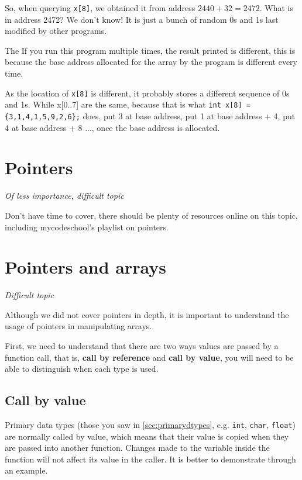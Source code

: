 So, when querying \texttt{x[8]}, we obtained it from address $2440+32 = 2472$. What is in address 2472? We don't know! It is just a bunch of random 0s and 1s last modified by other programs. 
\vspace{6mm}

\if{} The \else If you run this program multiple times, the result printed is different, this is because the \fi base address allocated for the array by the program is different every time. 

As the location of \texttt{x[8]} is different, it probably stores a different sequence of 0s and 1s. While x[0..7] are the same, because that is what \texttt{int x[8] = \{3,1,4,1,5,9,2,6\};} does, put 3 at base address, put 1 at base address + 4, put 4 at base address + 8 ..., once the base address is allocated.

\section{Pointers}

\textit{Of less importance, difficult topic}
\vspace{6mm}

Don't have time to cover, there should be plenty of resources online on this topic, including mycodeschool's playlist on pointers.

\section{Pointers and arrays}
\label{sec:passbyref}
\textit{Difficult topic}
\vspace{6mm}

Although we did not cover pointers in depth, it is important to understand the usage of pointers in manipulating arrays. 

First, we need to understand that there are two ways values are passed by a function call, that is, \textbf{call by reference} and \textbf{call by value}, you will need to be able to distinguish when each type is used.

\subsection{Call by value}

Primary data types (those you saw in \cref{sec:primarydtypes}, e.g. \texttt{int}, \texttt{char}, \texttt{float}) are normally called by value, which means that their value is copied when they are passed into another function. Changes made to the variable inside the function will not affect its value in the caller. It is better to demonstrate through an example.

